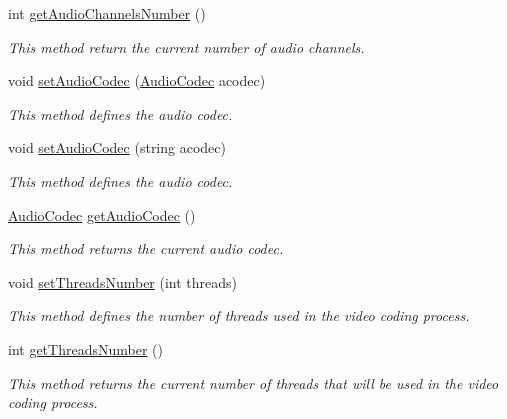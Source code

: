 \begin{DoxyCompactItemize}
int \hyperlink{classbr_1_1ufscar_1_1lince_1_1streaming_1_1AVEncoder_afa7947bc43d68e09a2fb206d2d15a33f}{getAudioChannelsNumber} ()
\begin{DoxyCompactList}\small\item\em This method return the current number of audio channels. \item\end{DoxyCompactList}\item 
void \hyperlink{classbr_1_1ufscar_1_1lince_1_1streaming_1_1AVEncoder_a5049d529b8005043fdbbbd30b7771662}{setAudioCodec} (\hyperlink{namespacebr_1_1ufscar_1_1lince_1_1streaming_ad12fee1ac355f8db230ab5a750cbe2b2}{AudioCodec} acodec)
\begin{DoxyCompactList}\small\item\em This method defines the audio codec. \item\end{DoxyCompactList}\item 
void \hyperlink{classbr_1_1ufscar_1_1lince_1_1streaming_1_1AVEncoder_ab98f7e542c0d37bfef68fc5d224dc3cf}{setAudioCodec} (string acodec)
\begin{DoxyCompactList}\small\item\em This method defines the audio codec. \item\end{DoxyCompactList}\item 
\hyperlink{namespacebr_1_1ufscar_1_1lince_1_1streaming_ad12fee1ac355f8db230ab5a750cbe2b2}{AudioCodec} \hyperlink{classbr_1_1ufscar_1_1lince_1_1streaming_1_1AVEncoder_a8bd91b18ccc4f8ae05cccd5540714b00}{getAudioCodec} ()
\begin{DoxyCompactList}\small\item\em This method returns the current audio codec. \item\end{DoxyCompactList}\item 
void \hyperlink{classbr_1_1ufscar_1_1lince_1_1streaming_1_1AVEncoder_ab1aeb8d77d5bd17ba0581807dab36b57}{setThreadsNumber} (int threads)
\begin{DoxyCompactList}\small\item\em This method defines the number of threads used in the video coding process. \item\end{DoxyCompactList}\item 
int \hyperlink{classbr_1_1ufscar_1_1lince_1_1streaming_1_1AVEncoder_a5a8de8942a8ae3e4de6a175bd8b81bcb}{getThreadsNumber} ()
\begin{DoxyCompactList}\small\item\em This method returns the current number of threads that will be used in the video coding process. \item\end{DoxyCompactList}\item 

\end{DoxyCompactItemize}
